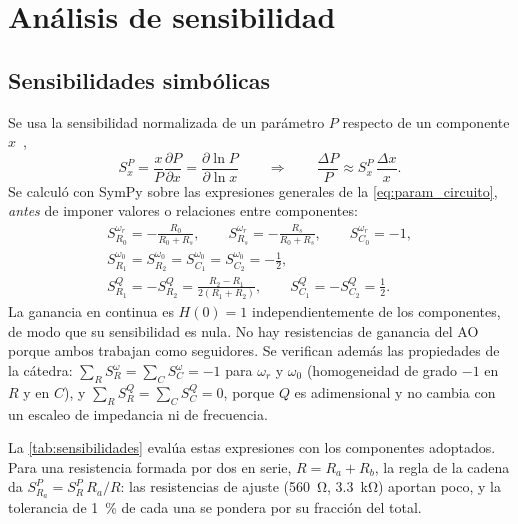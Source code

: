 \section{Análisis de sensibilidad}
\label{sec:sensibilidad}

\subsection{Sensibilidades simbólicas}
Se usa la sensibilidad normalizada de un parámetro $P$ respecto de un componente $x$~\cite{daryanani1976,apuntes2026},
\begin{equation}
  S^P_x = \frac{x}{P}\frac{\partial P}{\partial x} = \frac{\partial \ln P}{\partial \ln x}
  \qquad\Longrightarrow\qquad \frac{\Delta P}{P} \approx S^P_x\,\frac{\Delta x}{x}.
  \label{eq:sens_def}
\end{equation}
Se calculó con SymPy sobre las expresiones generales de la \cref{eq:param_circuito}, \emph{antes} de imponer valores o relaciones entre componentes:
\begin{gather}
  S^{\omega_r}_{R_0} = -\frac{R_0}{R_0+R_s},\qquad S^{\omega_r}_{R_s} = -\frac{R_s}{R_0+R_s},\qquad S^{\omega_r}_{C_0} = -1, \label{eq:sens_wr}\\
  S^{\omega_0}_{R_1} = S^{\omega_0}_{R_2} = S^{\omega_0}_{C_1} = S^{\omega_0}_{C_2} = -\frac12, \label{eq:sens_w0}\\
  S^{Q}_{R_1} = -S^{Q}_{R_2} = \frac{R_2-R_1}{2(R_1+R_2)},\qquad S^{Q}_{C_1} = -S^{Q}_{C_2} = \frac12. \label{eq:sens_Q}
\end{gather}
La ganancia en continua es $H(0) = 1$ independientemente de los componentes, de modo que su sensibilidad es nula. No hay resistencias de ganancia del
AO porque ambos trabajan como seguidores. Se verifican además las propiedades de la cátedra: $\sum_R S^{\omega}_R = \sum_C S^{\omega}_C = -1$ para
$\omega_r$ y $\omega_0$ (homogeneidad de grado $-1$ en $R$ y en $C$), y $\sum_R S^Q_R = \sum_C S^Q_C = 0$, porque $Q$ es adimensional y no cambia con un
escaleo de impedancia ni de frecuencia.

La \cref{tab:sensibilidades} evalúa estas expresiones con los componentes adoptados. Para una resistencia formada por dos en serie,
$R = R_a + R_b$, la regla de la cadena da $S^P_{R_a} = S^P_R\,R_a/R$: las resistencias de ajuste (\qty{560}{\ohm}, \qty{3.3}{\kilo\ohm}) aportan
poco, y la tolerancia de \qty{1}{\percent} de cada una se pondera por su fracción del total.

\begin{table}[H]
  \centering\small
  \caption{Sensibilidades normalizadas evaluadas en los componentes adoptados. Abajo, las resistencias individuales de cada par en serie.}
  \label{tab:sensibilidades}
\end{table}

